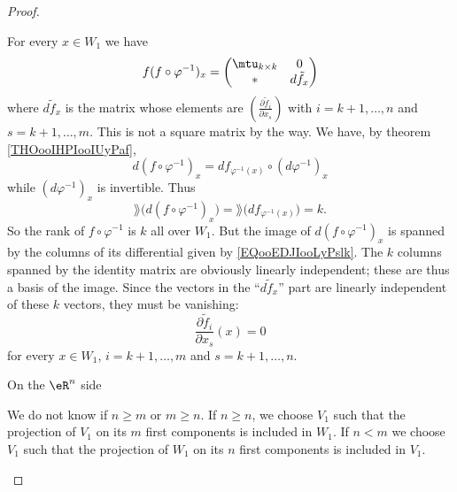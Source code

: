 \begin{proof}
\begin{subproof}
\begin{subproof}
                    For every \( x\in W_1\) we have
                    \begin{equation}        \label{EQooEDJIooLyPslk}
                        f(f\circ \varphi^{-1})_x=\begin{pmatrix}
                            \mtu_{k\times k}    &   0    \\ 
                            *    &   d\tilde f_x    
                        \end{pmatrix}
                    \end{equation}
                    where \( d\tilde f_x\) is the matrix whose elements are \( \left( \frac{ \partial \tilde f_i }{ \partial x_s } \right)\) with \( i=k+1,\ldots, n\) and \( s=k+1,\ldots, m\). This is not a square matrix by the way. We have, by theorem \ref{THOooIHPIooIUyPaf},
                    \begin{equation}
                        d(f\circ\varphi^{-1})_x=df_{\varphi^{-1}(x)}\circ(d\varphi^{-1})_x
                    \end{equation}
                    while \( (d\varphi^{-1})_x\) is invertible. Thus
                    \begin{equation}
                        \rang\big( d(f\circ\varphi^{-1})_x \big)=\rang\big( df_{\varphi^{-1}(x)} \big)=k.
                    \end{equation}
                    So the rank of \( f\circ\varphi^{-1}\) is \( k\) all over \( W_1\). But the image of \( d(f\circ\varphi^{-1})_x\) is spanned by the columns of its differential given by \eqref{EQooEDJIooLyPslk}. The \( k \) columns spanned by the identity matrix are obviously linearly independent; these are thus a basis of the image. Since the vectors in the ``\( d\tilde f_x\)'' part are linearly independent of these \( k\) vectors, they must be vanishing:
                    \begin{equation}
                        \frac{ \partial \tilde f_i }{ \partial x_s }(x)=0
                    \end{equation}
                    for every \( x\in W_1\), \( i=k+1,\ldots, m\) and \( s=k+1,\ldots, n\).

                \item[On the \( \eR^n\) side]

                    We do not know if \( n\geq m\) or \( m\geq n\). If \( n\geq n\), we choose \( V_1\) such that the projection of \( V_1\) on its \( m\) first components is included in \( W_1\). If \( n<m\) we choose \( V_1\) such that the projection of \( W_1\) on its \( n\) first components is included in \( V_1\).


\end{subproof}
\end{subproof}
\end{proof}
